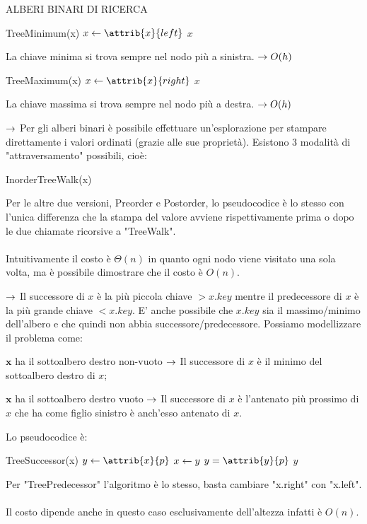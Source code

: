 \documentclass[8pt]{extarticle}
\begin{document}
\begin{formulario}
\begin{myParagraph}{ALBERI BINARI DI RICERCA}
			\begin{code}{TreeMinimum(x)}
\li {}
	\li $x\la\attrib{x}{left}$
\END
\li \RETURN $x$
			\end{code}
La chiave minima si trova sempre nel nodo più a sinistra.
$\rightarrow O(h)$
			\begin{code}{TreeMaximum(x)}
\li {}
	\li $x\la\attrib{x}{right}$
\END
\li \RETURN $x$
			\end{code}
La chiave massima si trova sempre nel nodo più a destra.
$\rightarrow O(h)$
\break

 $\rightarrow$ Per gli alberi binari è possibile effettuare un'esplorazione per stampare direttamente i valori ordinati (grazie alle sue proprietà). Esistono 3 modalità di "attraversamento" possibili, cioè:
			\begin{code}{InorderTreeWalk(x)}
\li {}
	\li {}
	\li	 {} 
	\li {}
\END
			\end{code}
Per le altre due versioni, Preorder e Postorder, lo pseudocodice è lo stesso con l'unica differenza che la stampa del valore avviene rispettivamente prima o dopo le due chiamate ricorsive a "TreeWalk". \\
\\
Intuitivamente il costo è $\Theta(n)$ in quanto ogni nodo viene visitato una sola volta, ma è possibile dimostrare che il costo è $O(n)$.
\break

 $\rightarrow$ Il successore di $x$ è la più piccola chiave $>x.key$ mentre il predecessore di $x$ è la più grande chiave $<x.key$. E' anche possibile che $x.key$ sia il massimo/minimo dell'albero e che quindi non abbia successore/predecessore. Possiamo modellizzare il problema come:
			\begin{descr}{1}
				\item[$\bm{x}$ ha il sottoalbero destro non-vuoto] $\rightarrow$ Il successore di $x$ è il minimo del sottoalbero destro di $x$;
				\item[$\bm{x}$ ha il sottoalbero destro vuoto] $\rightarrow$ Il successore di $x$ è l'antenato più prossimo di $x$ che ha come figlio sinistro è anch'esso antenato di $x$.
			\end{descr}
Lo pseudocodice è:
			\begin{code}{TreeSuccessor(x)}
\li {}
	\li \RETURN {}
\END
\li $y\la\attrib{x}{p}$
\li {}
	\li $x\leftarrow y$
	\li $y=\attrib{y}{p}$
\END
\li \RETURN $y$
			\end{code}
Per "TreePredecessor" l'algoritmo è lo stesso, basta cambiare "x.right" con "x.left".\\
\\
Il costo dipende anche in questo caso esclusivamente dell'altezza infatti è $O(n)$.
\break


\end{myParagraph}
\end{formulario}
\end{document}

